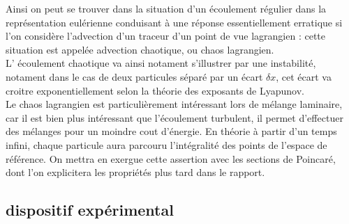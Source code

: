 \documentclass[a4paper,12pt,titlepage]{report}
\begin{document}
\begin{onehalfspace}
Ainsi on peut se trouver dans la situation d'un écoulement régulier dans la représentation eulérienne conduisant à une réponse essentiellement erratique si l'on considère l'advection d'un traceur d'un point de vue lagrangien : cette situation est appelée advection chaotique, ou chaos lagrangien.\\
L' écoulement chaotique va ainsi notament s'illustrer par une instabilité, notament dans le cas de deux particules séparé par un écart $\delta x$, cet écart va croitre exponentiellement selon la théorie des exposants de Lyapunov. 
\\
Le chaos lagrangien est particulièrement intéressant lors de mélange laminaire, car il est bien plus intéressant que l'écoulement turbulent, il permet d'effectuer des mélanges pour un moindre cout d'énergie. En théorie à partir d'un temps infini, chaque particule aura parcouru l'intégralité des points de l'espace de référence.  On mettra en exergue cette assertion avec les sections de Poincaré, dont l'on explicitera les propriétés plus tard dans le rapport. 

\subsection{dispositif expérimental} 


\end{onehalfspace}
\end{document}
